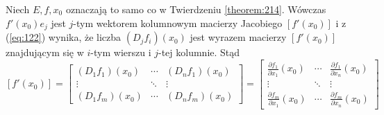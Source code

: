\documentclass[leqno]{article}
\begin{document}
\begin{justify}
\begin{wniosek}
{
    Niech $E,f,x_0$ oznaczają to samo co w Twierdzeniu \ref{theorem:214}.
    Wówczas $f'(x_0)e_j$ jest $j$-tym wektorem kolumnowym macierzy Jacobiego $[f'(x_0)]$ i z (\ref{eq:122}) wynika, że
    liczba $(D_j f_i)(x_0)$ jest wyrazem macierzy $[f'(x_0)]$ znajdującym się w $i$-tym wierszu i $j$-tej kolumnie. Stąd 
    \[
        [f'(x_0)] =
            \left[
            \begin{array}{ccc}
                (D_1 f_1)(x_0)  & \cdots & (D_n f_1)(x_0) \\
                \vdots  & \ddots & \vdots \\
                (D_1 f_m)(x_0)  & \cdots & (D_n f_m)(x_0)
            \end{array}
            \right]
            =
            \left[
            \begin{array}{ccc}
                \frac{\partial f_1}{\partial x_1}(x_0)  & \cdots & \frac{\partial f_1}{\partial x_n}(x_0) \\
                \vdots  & \ddots & \vdots \\
                \frac{\partial f_m}{\partial x_1}(x_0)  & \cdots & \frac{\partial f_m}{\partial x_n}(x_0)
            \end{array}
            \right]
    \]
}
\end{wniosek}


\end{justify}
\end{document}
